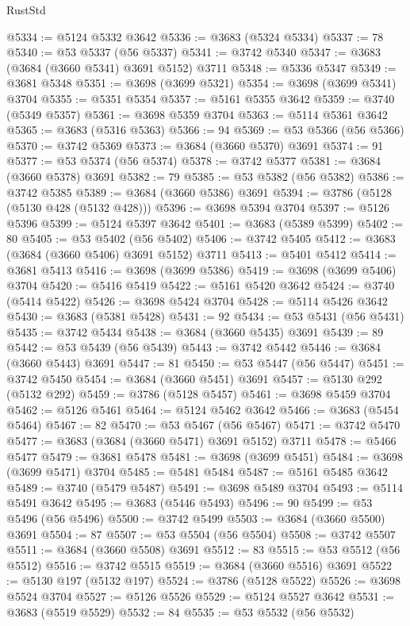 \begin{lexlean}{RustStd}
\begin{coremodule}
{\begin{coremodule}
{{{{{{{{{{{{{{{{{{{{{{{{{{{{{{{{{{{{{{{{{{{{{{{@5334 := @5124 @5332 @3642
@5336 := @3683 (@5324 @5334)
@5337 := 78
@5340 := @53 @5337 (@56 @5337)
@5341 := @3742 @5340
@5347 := @3683 (@3684 (@3660 @5341) @3691 @5152) @3711
@5348 := @5336 @5347
@5349 := @3681 @5348
@5351 := @3698 (@3699 @5321)
@5354 := @3698 (@3699 @5341) @3704
@5355 := @5351 @5354
@5357 := @5161 @5355 @3642
@5359 := @3740 (@5349 @5357)
@5361 := @3698 @5359 @3704
@5363 := @5114 @5361 @3642
@5365 := @3683 (@5316 @5363)
@5366 := 94
@5369 := @53 @5366 (@56 @5366)
@5370 := @3742 @5369
@5373 := @3684 (@3660 @5370) @3691
@5374 := 91
@5377 := @53 @5374 (@56 @5374)
@5378 := @3742 @5377
@5381 := @3684 (@3660 @5378) @3691
@5382 := 79
@5385 := @53 @5382 (@56 @5382)
@5386 := @3742 @5385
@5389 := @3684 (@3660 @5386) @3691
@5394 := @3786 (@5128 (@5130 @428 (@5132 @428)))
@5396 := @3698 @5394 @3704
@5397 := @5126 @5396
@5399 := @5124 @5397 @3642
@5401 := @3683 (@5389 @5399)
@5402 := 80
@5405 := @53 @5402 (@56 @5402)
@5406 := @3742 @5405
@5412 := @3683 (@3684 (@3660 @5406) @3691 @5152) @3711
@5413 := @5401 @5412
@5414 := @3681 @5413
@5416 := @3698 (@3699 @5386)
@5419 := @3698 (@3699 @5406) @3704
@5420 := @5416 @5419
@5422 := @5161 @5420 @3642
@5424 := @3740 (@5414 @5422)
@5426 := @3698 @5424 @3704
@5428 := @5114 @5426 @3642
@5430 := @3683 (@5381 @5428)
@5431 := 92
@5434 := @53 @5431 (@56 @5431)
@5435 := @3742 @5434
@5438 := @3684 (@3660 @5435) @3691
@5439 := 89
@5442 := @53 @5439 (@56 @5439)
@5443 := @3742 @5442
@5446 := @3684 (@3660 @5443) @3691
@5447 := 81
@5450 := @53 @5447 (@56 @5447)
@5451 := @3742 @5450
@5454 := @3684 (@3660 @5451) @3691
@5457 := @5130 @292 (@5132 @292)
@5459 := @3786 (@5128 @5457)
@5461 := @3698 @5459 @3704
@5462 := @5126 @5461
@5464 := @5124 @5462 @3642
@5466 := @3683 (@5454 @5464)
@5467 := 82
@5470 := @53 @5467 (@56 @5467)
@5471 := @3742 @5470
@5477 := @3683 (@3684 (@3660 @5471) @3691 @5152) @3711
@5478 := @5466 @5477
@5479 := @3681 @5478
@5481 := @3698 (@3699 @5451)
@5484 := @3698 (@3699 @5471) @3704
@5485 := @5481 @5484
@5487 := @5161 @5485 @3642
@5489 := @3740 (@5479 @5487)
@5491 := @3698 @5489 @3704
@5493 := @5114 @5491 @3642
@5495 := @3683 (@5446 @5493)
@5496 := 90
@5499 := @53 @5496 (@56 @5496)
@5500 := @3742 @5499
@5503 := @3684 (@3660 @5500) @3691
@5504 := 87
@5507 := @53 @5504 (@56 @5504)
@5508 := @3742 @5507
@5511 := @3684 (@3660 @5508) @3691
@5512 := 83
@5515 := @53 @5512 (@56 @5512)
@5516 := @3742 @5515
@5519 := @3684 (@3660 @5516) @3691
@5522 := @5130 @197 (@5132 @197)
@5524 := @3786 (@5128 @5522)
@5526 := @3698 @5524 @3704
@5527 := @5126 @5526
@5529 := @5124 @5527 @3642
@5531 := @3683 (@5519 @5529)
@5532 := 84
@5535 := @53 @5532 (@56 @5532)
}}}}}}}}}}}}}}}}}}}}}}}}}}}}}}}}}}}}}}}}}}}}}}}
\end{coremodule}}
\end{coremodule}
\end{lexlean}

